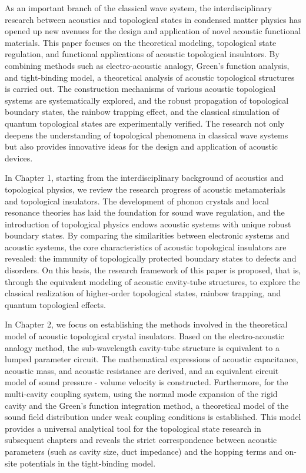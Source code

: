 \documentclass[
    anonymous,              %
    type = doctor,
  ]{njuthesis}
\begin{document}
\begin{abstract*}
  As an important branch of the classical wave system, the interdisciplinary research between acoustics and topological states in condensed matter physics has opened up new avenues for the design and application of novel acoustic functional materials. This paper focuses on the theoretical modeling, topological state regulation, and functional applications of acoustic topological insulators. By combining methods such as electro-acoustic analogy, Green's function analysis, and tight-binding model, a theoretical analysis of acoustic topological structures is carried out. The construction mechanisms of various acoustic topological systems are systematically explored, and the robust propagation of topological boundary states, the rainbow trapping effect, and the classical simulation of quantum topological states are experimentally verified. The research not only deepens the understanding of topological phenomena in classical wave systems but also provides innovative ideas for the design and application of acoustic devices.

  In Chapter 1, starting from the interdisciplinary background of acoustics and topological physics, we review the research progress of acoustic metamaterials and topological insulators. The development of phonon crystals and local resonance theories has laid the foundation for sound wave regulation, and the introduction of topological physics endows acoustic systems with unique robust boundary states. By comparing the similarities between electronic systems and acoustic systems, the core characteristics of acoustic topological insulators are revealed: the immunity of topologically protected boundary states to defects and disorders. On this basis, the research framework of this paper is proposed, that is, through the equivalent modeling of acoustic cavity-tube structures, to explore the classical realization of higher-order topological states, rainbow trapping, and quantum topological effects.
  
  In Chapter 2, we focus on establishing the methods involved in the theoretical model of acoustic topological crystal insulators. Based on the electro-acoustic analogy method, the sub-wavelength cavity-tube structure is equivalent to a lumped parameter circuit. The mathematical expressions of acoustic capacitance, acoustic mass, and acoustic resistance are derived, and an equivalent circuit model of sound pressure - volume velocity is constructed. Furthermore, for the multi-cavity coupling system, using the normal mode expansion of the rigid cavity and the Green's function integration method, a theoretical model of the sound field distribution under weak coupling conditions is established. This model provides a universal analytical tool for the topological state research in subsequent chapters and reveals the strict correspondence between acoustic parameters (such as cavity size, duct impedance) and the hopping terms and on-site potentials in the tight-binding model.
  

\end{abstract*}
\end{document}
